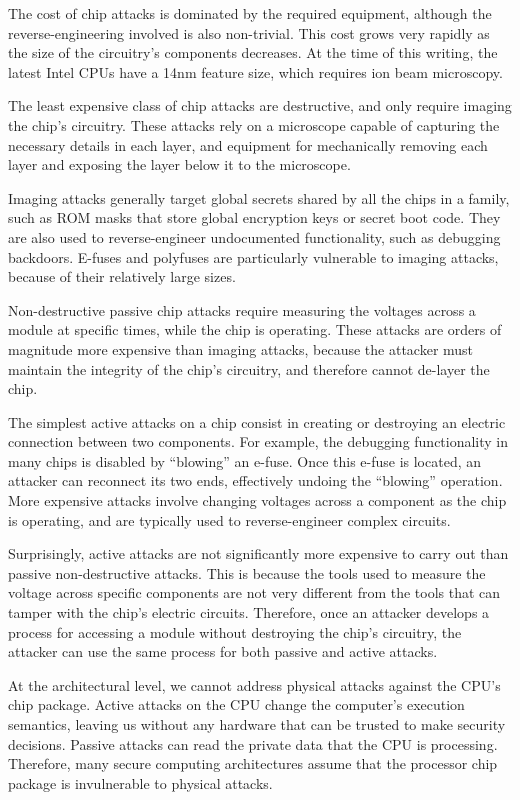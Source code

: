 The cost of chip attacks is dominated by the required equipment, although the
reverse-engineering involved is also non-trivial. This cost grows very rapidly
as the size of the circuitry's components decreases. At the time of this
writing, the latest Intel CPUs have a 14nm feature size, which requires ion
beam microscopy. %

The least expensive class of chip attacks are destructive, and only require
imaging the chip's circuitry. These attacks rely on a microscope capable of
capturing the necessary details in each layer, and equipment for mechanically
removing each layer and exposing the layer below it to the microscope.

Imaging attacks generally target global secrets shared by all the chips in a
family, such as ROM masks that store global encryption keys or secret boot
code. They are also used to reverse-engineer undocumented functionality, such
as debugging backdoors. E-fuses and polyfuses are particularly vulnerable to
imaging attacks, because of their relatively large sizes.

Non-destructive passive chip attacks require measuring the voltages across a
module at specific times, while the chip is operating. These attacks are orders
of magnitude more expensive than imaging attacks, because the attacker must
maintain the integrity of the chip's circuitry, and therefore cannot de-layer
the chip.

The simplest active attacks on a chip consist in creating or destroying an
electric connection between two components. For example, the debugging
functionality in many chips is disabled by ``blowing'' an e-fuse. Once this
e-fuse is located, an attacker can reconnect its two ends, effectively undoing
the ``blowing'' operation. More expensive attacks involve changing voltages
across a component as the chip is operating, and are typically used to
reverse-engineer complex circuits.

Surprisingly, active attacks are not significantly more expensive to carry out
than passive non-destructive attacks. This is because the tools used to measure
the voltage across specific components are not very different from the tools
that can tamper with the chip's electric circuits. Therefore, once an attacker
develops a process for accessing a module without destroying the chip's
circuitry, the attacker can use the same process for both passive and active
attacks.

At the architectural level, we cannot address physical attacks against the
CPU's chip package. Active attacks on the CPU change the computer's execution
semantics, leaving us without any hardware that can be trusted to make security
decisions. Passive attacks can read the private data that the CPU is
processing. Therefore, many secure computing architectures assume that the
processor chip package is invulnerable to physical attacks.

